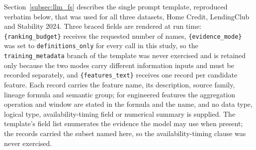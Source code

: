 \documentclass[final,5p,twocolumn]{elsarticle}
\begin{document}
Section~\ref{subsec:llm_fs} describes the single prompt template, reproduced verbatim below, that was used for all three datasets, Home Credit, LendingClub and Stability 2024. Three braced fields are rendered at run time: \texttt{\{ranking\_\allowbreak budget\}} receives the requested number of names, \texttt{\{evidence\_\allowbreak mode\}} was set to \texttt{definitions\_\allowbreak only} for every call in this study, so the \texttt{training\_\allowbreak metadata} branch of the template was never exercised and is retained only because the two modes carry different information inputs and must be recorded separately, and \texttt{\{features\_\allowbreak text\}} receives one record per candidate feature. Each record carries the feature name, its description, source family, lineage formula and semantic group; for engineered features the aggregation operation and window are stated in the formula and the name, and no data type, logical type, availability-timing field or numerical summary is supplied. The template's field list enumerates the evidence the model may use when present; the records carried the subset named here, so the availability-timing clause was never exercised.
\end{document}
